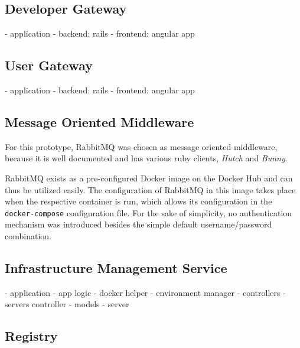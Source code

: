   \subsection{Developer Gateway} %
    \label{sub:developer_gateway}
      - application
        - backend: rails
        - frontend: angular app

  \subsection{User Gateway} %
    \label{sub:user_gateway}
      - application
        - backend: rails
        - frontend: angular app

  \subsection{Message Oriented Middleware} %
    \label{sub:message_oriented_middleware}
      For this prototype, RabbitMQ was chosen as message oriented middleware, because it is well documented and has various ruby clients, \eg \emph{Hutch} and \emph{Bunny}.

      RabbitMQ exists as a pre-configured Docker image on the Docker Hub and can thus be utilized easily. The configuration of RabbitMQ in this image takes place when the respective container is run, which allows its configuration in the \texttt{docker-compose} configuration file.
      For the sake of simplicity, no authentication mechanism was introduced besides the simple default username/password combination.

  \subsection{Infrastructure Management Service} %
    \label{sub:infrastructure_management_service}
      - application
        - app logic
          - docker helper
          - environment manager
        - controllers
          - servers controller
        - models
          - server


  \subsection{Registry} %
    \label{sub:registry}

